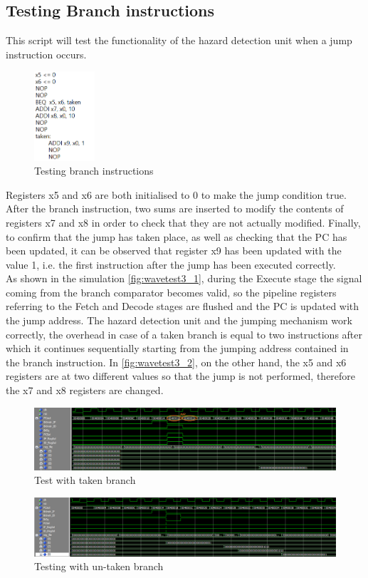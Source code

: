 \subsection{Testing Branch instructions}
This script will test the functionality of the hazard detection unit when a jump instruction occurs.
\begin{figure}[H]
	\centering
	\includegraphics[width=0.2\textwidth]{sec3/images/test3.png}
	\caption{Testing branch instructions}
	\label{fig:test3}
\end{figure}
\noindent Registers x5 and x6 are both initialised to 0 to make the jump condition true. After the branch instruction, two sums are inserted to modify the contents of registers x7 and x8 in order to check that they are not actually modified. Finally, to confirm that the jump has taken place, as well as checking that the PC has been updated, it can be observed that register x9 has been updated with the value 1, i.e. the first instruction after the jump has been executed correctly.\\
As shown in the simulation \autoref{fig:wavetest3_1}, during the Execute stage the signal coming from the branch comparator becomes valid, so the pipeline registers referring to the Fetch and Decode stages are flushed and the PC is updated with the jump address. The hazard detection unit and the jumping mechanism work correctly, the overhead in case of a taken branch is equal to two instructions after which it continues sequentially starting from the jumping address contained in the branch instruction.
In \autoref{fig:wavetest3_2}, on the other hand, the x5 and x6 registers are at two different values so that the jump is not performed, therefore the x7 and x8 registers are changed.
\begin{figure}[H]
	\centering
	\includegraphics[width=1\textwidth]{sec3/images/wave_test3_1.png}
	\caption{Test with taken branch}
	\label{fig:wavetest3_1}
\end{figure}
\begin{figure}[H]
	\centering
	\includegraphics[width=1\textwidth]{sec3/images/wave_test3_2.png}
	\caption{Testing with un-taken branch}
	\label{fig:wavetest3_2}
\end{figure}

